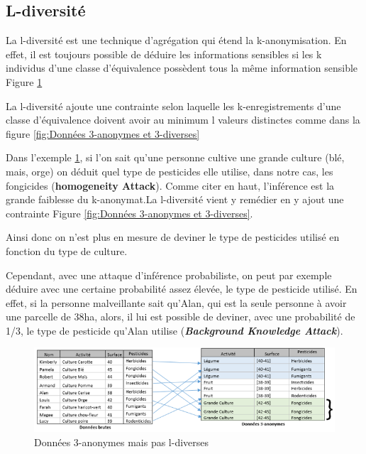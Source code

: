 \subsection{L-diversité}

La l-diversité est une technique d’agrégation qui étend la k-anonymisation. En effet, il est toujours possible de déduire les informations sensibles si les k individus d’une classe d’équivalence possèdent tous la même information sensible Figure \ref{fig:Données 3-anonymes mais pas l-diverses}

La l-diversité ajoute une contrainte selon laquelle les k-enregistrements d’une classe d’équivalence doivent avoir au minimum l valeurs distinctes comme dans la figure \ref{fig:Données 3-anonymes et 3-diverses}


Dans l’exemple \ref{fig:Données 3-anonymes mais pas l-diverses}, si l’on sait qu’une personne cultive une grande culture (blé, mais, orge) on déduit quel type de pesticides elle utilise, dans notre cas, les fongicides (\textbf{\textbf{homogeneity Attack}}).  Comme citer en haut, l’inférence est la grande faiblesse du k-anonymat.La l-diversité vient y remédier en y ajout une contrainte Figure \ref{fig:Données 3-anonymes et 3-diverses}. 

Ainsi donc on n’est plus en mesure de deviner le type de pesticides utilisé en fonction du type de culture.  

Cependant, avec une attaque d’inférence probabiliste, on peut par exemple déduire avec une certaine probabilité assez élevée, le type de pesticide utilisé. En effet, si la personne malveillante sait qu’Alan, qui est la seule personne à avoir une parcelle de 38ha, alors, il lui est possible de deviner, avec une probabilité de 1/3, le type de pesticide qu’Alan utilise (\textit{\textbf{Background Knowledge Attack}}). 
\begin{figure}[!h]
    \centering
      \includegraphics[width=1\textwidth]{images/anonymisation/l_divers_image1.png}
    \caption{ Données 3-anonymes mais pas l-diverses}
     \label{fig:Données 3-anonymes mais pas l-diverses}
   
\end{figure}


